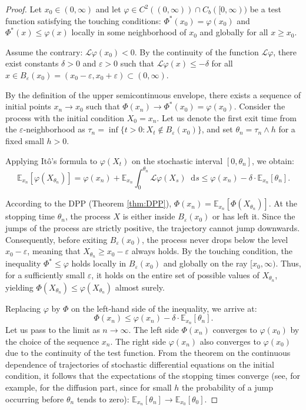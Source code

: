 \documentclass[smallextended]{svjour3}
\providecommand{\diff}{\mathop{}\!\mathrm{d}}
\begin{document}
\begin{proof}
Let $x_0 \in (0, \infty)$ and let $\varphi \in C^2((0, \infty)) \cap C_b([0, \infty))$ be a test function satisfying the touching conditions: $\Phi^*(x_0) = \varphi(x_0)$ and $\Phi^*(x) \le \varphi(x)$ locally in some neighborhood of $x_0$ and globally for all $x \ge x_0$.

Assume the contrary: $\mathcal{L}\varphi(x_0) < 0$. By the continuity of the function $\mathcal{L}\varphi$, there exist constants $\delta > 0$ and $\varepsilon > 0$ such that $\mathcal{L}\varphi(x) \le -\delta$ for all $x \in B_\varepsilon(x_0) = (x_0-\varepsilon, x_0+\varepsilon) \subset (0, \infty)$. 

By the definition of the upper semicontinuous envelope, there exists a sequence of initial points $x_n \to x_0$ such that $\Phi(x_n) \to \Phi^*(x_0) = \varphi(x_0)$. Consider the process with the initial condition $X_0 = x_n$. Let us denote the first exit time from the $\varepsilon$-neighborhood as $\tau_n = \inf\{t > 0 : X_t \notin B_\varepsilon(x_0)\}$, and set $\theta_n = \tau_n \wedge h$ for a fixed small $h > 0$.

Applying It\^{o}'s formula to $\varphi(X_t)$ on the stochastic interval $[0, \theta_n]$, we obtain:
$$ \mathbb{E}_{x_n}[\varphi(X_{\theta_n})] = \varphi(x_n) + \mathbb{E}_{x_n} \int_0^{\theta_n} \mathcal{L}\varphi(X_s) \diff s \le \varphi(x_n) - \delta \cdot \mathbb{E}_{x_n}[\theta_n]. $$

According to the DPP (Theorem \ref{thm:DPP}), $\Phi(x_n) = \mathbb{E}_{x_n}[\Phi(X_{\theta_n})]$. At the stopping time $\theta_n$, the process $X$ is either inside $B_\varepsilon(x_0)$ or has left it. Since the jumps of the process are strictly positive, the trajectory cannot jump downwards. Consequently, before exiting $B_\varepsilon(x_0)$, the process never drops below the level $x_0 - \varepsilon$, meaning that $X_{\theta_n} \ge x_0 - \varepsilon$ always holds. By the touching condition, the inequality $\Phi^* \le \varphi$ holds locally in $B_\varepsilon(x_0)$ and globally on the ray $[x_0, \infty)$. Thus, for a sufficiently small $\varepsilon$, it holds on the entire set of possible values of $X_{\theta_n}$, yielding $\Phi(X_{\theta_n}) \le \varphi(X_{\theta_n})$ almost surely.

Replacing $\varphi$ by $\Phi$ on the left-hand side of the inequality, we arrive at:
$$ \Phi(x_n) \le \varphi(x_n) - \delta \cdot \mathbb{E}_{x_n}[\theta_n]. $$
Let us pass to the limit as $n \to \infty$. The left side $\Phi(x_n)$ converges to $\varphi(x_0)$ by the choice of the sequence $x_n$. The right side $\varphi(x_n)$ also converges to $\varphi(x_0)$ due to the continuity of the test function. From the theorem on the continuous dependence of trajectories of stochastic differential equations on the initial condition, it follows that the expectations of the stopping times converge (see, for example, \cite[Chapter 5]{KaratzasShreve1991} for the diffusion part, since for small $h$ the probability of a jump occurring before $\theta_n$ tends to zero): $\mathbb{E}_{x_n}[\theta_n] \to \mathbb{E}_{x_0}[\theta_0]$. 


\end{proof}
\end{document}
